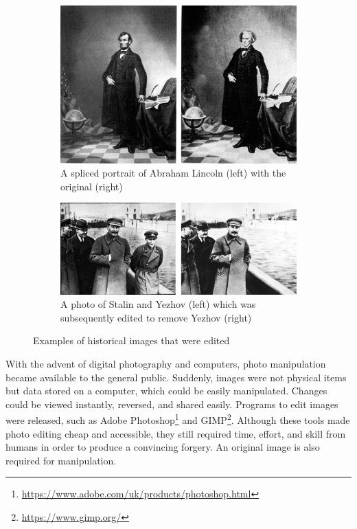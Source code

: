 \begin{figure}[H]
    \centering
    \begin{subfigure}{0.45\textwidth}
            \includegraphics[width=\textwidth]{dissertation//figures/lincoln1960.jpg}
            \caption{A spliced portrait of Abraham Lincoln (left) with the original (right)\cite{singh2018art}}
            \label{fig:lincoln}
    \end{subfigure}
    \begin{subfigure}{0.45\textwidth}
        \includegraphics[width=\textwidth]{dissertation//figures/stalin.png}
        \caption{A photo of Stalin and Yezhov (left) which was subsequently edited to remove Yezhov (right)}
        \label{fig:stalin-yezhov}
    \end{subfigure}
    \caption{Examples of historical images that were edited}
    \label{fig:edited-images}
\end{figure}

With the advent of digital photography and computers, photo manipulation became available to the general public. Suddenly, images were not physical items but data stored on a computer, which could be easily manipulated. Changes could be viewed instantly, reversed, and shared easily. Programs to edit images were released, such as Adobe Photoshop\footnote{\url{https://www.adobe.com/uk/products/photoshop.html}} and GIMP\footnote{\url{https://www.gimp.org/}}. Although these tools made photo editing cheap and accessible, they still required time, effort, and skill from humans in order to produce a convincing forgery. An original image is also required for manipulation.

